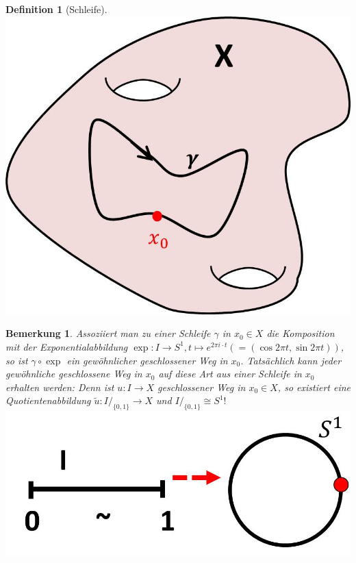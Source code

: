 \documentclass[a4paper,11pt,notitlepage]{report}
\newtheorem{definition}{Definition}[chapter]
\newtheorem{remark}{Bemerkung}[chapter]
\begin{document}
\begin{definition}[Schleife]
	 \newline \includegraphics[scale=0.3]{images/Schleife.jpg}
\end{definition}

\begin{remark}{}
	Assoziiert man zu einer Schleife $\gamma$ in $x_0 \in X$ die Komposition mit der Exponentialabbildung $\exp \colon I \rightarrow S^1, t \mapsto e^{2 \pi i \cdot t} (= (\cos 2 \pi t, \sin 2 \pi t))$, so ist $\gamma \circ \exp$ ein gewöhnlicher geschlossener Weg in $x_0$.
	\newline
	Tatsächlich kann jeder gewöhnliche geschlossene Weg in $x_0$ auf diese Art aus einer Schleife in $x_0$ erhalten werden:
	\newline
	Denn ist $u \colon I \rightarrow X$ geschlossener Weg in $x_0 \in X$, so existiert eine Quotientenabbildung $\tilde{u}\colon I/_{\{0,1\}} \rightarrow X$ und $I/_{\{0,1\}} \cong S^1!$\newline
	\includegraphics[scale=0.3]{images/I_S1.jpg}
\end{remark}
\end{document}
